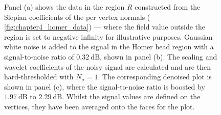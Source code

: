 \begin{figure}[htp]
	\centering
	\hfill
	\hfill
	\caption[
		A denoising demonstration for a field on the Homer mesh
	]{
		Panel (a) shows the data in the region \(R\) constructed from the Slepian coefficients of the per vertex normals (\cf{} \cref{fig:chapter4_homer_data}) --- where the field value outside the region is set to negative infinity for illustrative purposes.
		Gaussian white noise is added to the signal in the Homer head region with a signal-to-noise ratio of \(\SI{0.32}{\dB}\), shown in panel (b).
		The scaling and wavelet coefficients of the noisy signal are calculated and are then hard-thresholded with \(N_{\sigma}=1\).
		The corresponding denoised plot is shown in panel (c), where the signal-to-noise ratio is boosted by \(\SI{1.97}{\dB}\) to \(\SI{2.29}{\dB}\).
		Whilst the signal values are defined on the vertices, they have been averaged onto the faces for the plot.
	}\label{fig:chapter4_denoising}
\end{figure}
